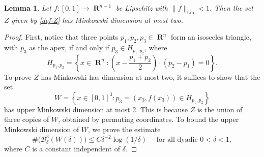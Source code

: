\documentclass[dvipsnames,letterpaper,12pt]{article}
\numberwithin{equation}{section}
\theoremstyle{plain}
\newtheorem{lemma}{Lemma}
\theoremstyle{remark}
\DeclareMathOperator{\RR}{\mathbf{R}}
\DeclareMathOperator{\setcolon}{\colon}
\begin{document}
\begin{lemma}
	Let $f\colon [0,1] \to \RR^{n-1}$ be Lipschitz with $\| f \|_{\text{Lip}} < 1$. Then the set $Z$ given by \eqref{def-Z} has Minkowski dimension at most two.
\end{lemma}
\begin{proof}
	First, notice that three points $p_1,p_2,p_3 \in \RR^n$ form an isosceles triangle, with $p_3$ as the apex, if and only if $p_3 \in H_{p_1,p_2}$, where
	\begin{equation} \label{def-H}  H_{p_1,p_2} = \left\{ x \in \RR^n \setcolon \left( x - \frac{p_1 + p_2}{2} \right) \cdot (p_2 - p_1) = 0 \right\}. \end{equation} 
	To prove $Z$ has Minkowski has dimension at most two, it suffices to show that the set
	\[ W = \left\{ x \in [0,1]^3 \setcolon p_3 = (x_3,f(x_3)) \in H_{p_1, p_2} \right\} \]
	has upper Minkowski dimension at most 2. This is because $Z$ is the union of three copies of $W$, obtained by permuting coordinates. To bound the upper Minkowski dimension of $W$, we prove the estimate
	\begin{equation}\label{boundOnWCoveringNumber}  \# \bigl(\mathcal B_{\delta}^3(W(\delta)) \bigr) \leq C \delta^{-2} \log(1/\delta) \quad \text{ for all dyadic } 0 < \delta < 1,  
	\end{equation}  
	where $C$ is a constant independent of $\delta$.


\end{proof}
\end{document}
